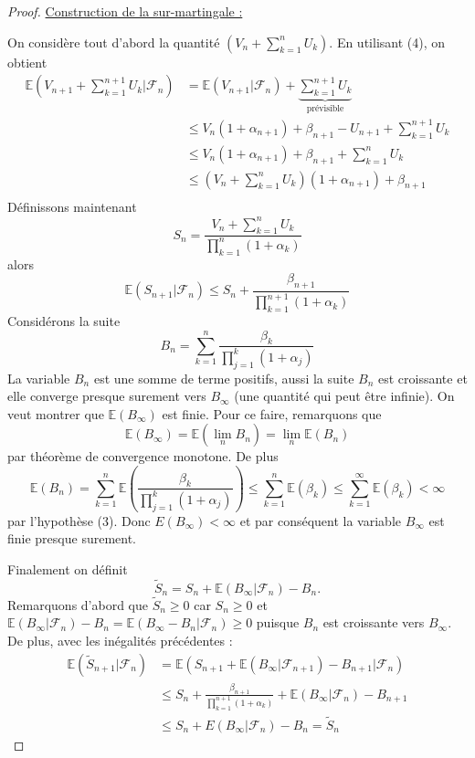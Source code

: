 \documentclass[a4paper,12pt]{book}
\newcommand{\E}{\mathbb{E}}
\newcommand{\Fc}{\mathcal{F}}
\begin{document}
\begin{proof}
\underline{Construction de la sur-martingale :}

On considère tout d'abord la quantité $(V_n+\sum_{k=1}^n U_k)$. En utilisant (4), on obtient
\begin{align*}
\E\left(V_{n+1}+\sum_{k=1}^{n+1} U_k\lvert \Fc_n \right)
&=\E\left(V_{n+1}\lvert \Fc_n \right)+\underbrace{\sum_{k=1}^{n+1} U_k}_{\text{prévisible}}\\
&\le V_n(1+\alpha_{n+1})+\beta_{n+1}-U_{n+1}+\sum_{k=1}^{n+1} U_k\\
&\le V_n(1+\alpha_{n+1})+\beta_{n+1}+\sum_{k=1}^{n} U_k\\
&\le (V_n+\sum_{k=1}^{n} U_k)(1+\alpha_{n+1})+\beta_{n+1}\\
\end{align*}
Définissons maintenant
\begin{equation}
\label{def:Sn}
S_n=\frac{V_n+\sum_{k=1}^n U_k}{\prod_{k=1}^n(1+\alpha_k)}
\end{equation}
alors
\begin{equation}
\label{eq:majS_n}
\E(S_{n+1}\lvert \Fc_n)\le S_n+\frac{\beta_{n+1}}{\prod_{k=1}^{n+1}(1+\alpha_k)}
\end{equation}
Considérons la suite
$$B_n= \sum_{k=1}^n \frac{\beta_{k}}{\prod_{j=1}^{k}(1+\alpha_j)}$$
La variable $B_n$ est une somme de terme positifs, aussi la suite $B_n$ est croissante et elle converge presque surement vers $B_\infty$ (une quantité qui peut être infinie).
On veut montrer que $\E(B_\infty)$ est finie. Pour ce faire, remarquons que $$\E(B_\infty)=\E(\lim_n B_n) = \lim_{n} \E( B_n)$$ par théorème de convergence monotone.
De plus
$$\E(B_n)=\sum_{k=1}^n\E\left(\frac{\beta_k}{\prod_{j=1}^{k}(1+\alpha_j)}\right) \le \sum_{k=1}^n\E(\beta_k) \le  \sum_{k=1}^\infty\E(\beta_k )<\infty$$ par l'hypothèse (3).
Donc $E(B_\infty)<\infty$ et par conséquent la variable $B_\infty$ est finie presque surement.

Finalement on définit
$$\widetilde{S}_{n}= S_n+\E(B_\infty\lvert\Fc_n) -B_n.$$
Remarquons d'abord que  $\widetilde{S}_n\ge0$ car $S_n\ge0$ et $\E(B_\infty\lvert\Fc_n) -B_n=\E(B_\infty-B_n\lvert\Fc_n) \ge0$ puisque $B_n$ est croissante vers $B_\infty$.
De plus, avec les inégalités précédentes :
\begin{align*}
\E(\widetilde{S}_{n+1}\lvert \Fc_n) &= \E(S_{n+1}+\E(B_\infty\lvert\Fc_{n+1}) -B_{n+1}\lvert \Fc_n) \\
&\le S_n + \frac{\beta_{n+1}}{\prod_{k=1}^{n+1}(1+\alpha_k)}+\E(B_\infty\lvert\Fc_{n}) -B_{n+1}\\
&\le S_n+ E(B_\infty\lvert\Fc_{n})-B_n = \widetilde{S}_n
\end{align*}


\end{proof}
\end{document}
